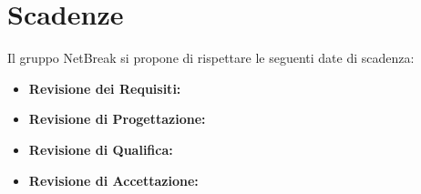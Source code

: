 \newpage
\section{Scadenze}
Il gruppo NetBreak si propone di rispettare le seguenti date di scadenza:\\
\begin{itemize}
	\item \textbf{Revisione dei Requisiti:}
	\item \textbf{Revisione di Progettazione:}
	\item \textbf{Revisione di Qualifica:}
	\item \textbf{Revisione di Accettazione:}
\end{itemize}
